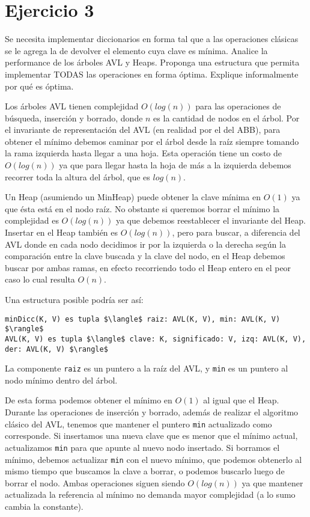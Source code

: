 \section*{Ejercicio 3}

Se necesita implementar diccionarios en forma tal que a las operaciones clásicas se le agrega la de devolver el elemento cuya clave es mínima. Analice la performance de los árboles AVL y Heaps. Proponga una estructura que permita implementar TODAS las operaciones en forma óptima. Explique informalmente por qué es óptima.

Los árboles AVL tienen complejidad $O(log(n))$ para las operaciones de búsqueda, inserción y borrado, donde $n$ es la cantidad de nodos en el árbol. Por el invariante de representación del AVL (en realidad por el del ABB), para obtener el mínimo debemos caminar por el árbol desde la raíz siempre tomando la rama izquierda hasta llegar a una hoja. Esta operación tiene un costo de $O(log(n))$ ya que para llegar hasta la hoja de más a la izquierda debemos recorrer toda la altura del árbol, que es $log(n)$.

Un Heap (asumiendo un MinHeap) puede obtener la clave mínima en $O(1)$ ya que ésta está en el nodo raíz. No obstante si queremos borrar el mínimo la complejidad es $O(log(n))$ ya que debemos reestablecer el invariante del Heap. Insertar en el Heap también es $O(log(n))$, pero para buscar, a diferencia del AVL donde en cada nodo decidimos ir por la izquierda o la derecha según la comparación entre la clave buscada y la clave del nodo, en el Heap debemos buscar por ambas ramas, en efecto recorriendo todo el Heap entero en el peor caso lo cual resulta $O(n)$.

Una estructura posible podría ser así:

\begin{lstlisting}
minDicc(K, V) es tupla $\langle$ raiz: AVL(K, V), min: AVL(K, V) $\rangle$
AVL(K, V) es tupla $\langle$ clave: K, significado: V, izq: AVL(K, V), der: AVL(K, V) $\rangle$
\end{lstlisting}

La componente \lstinline{raiz} es un puntero a la raíz del AVL, y \lstinline{min} es un puntero al nodo mínimo dentro del árbol.

De esta forma podemos obtener el mínimo en $O(1)$ al igual que el Heap. Durante las operaciones de inserción y borrado, además de realizar el algoritmo clásico del AVL, tenemos que mantener el puntero \lstinline{min} actualizado como corresponde. Si insertamos una nueva clave que es menor que el mínimo actual, actualizamos \lstinline{min} para que apunte al nuevo nodo insertado. Si borramos el mínimo, debemos actualizar \lstinline{min} con el nuevo mínimo, que podemos obtenerlo al mismo tiempo que buscamos la clave a borrar, o podemos buscarlo luego de borrar el nodo. Ambas operaciones siguen siendo $O(log(n))$ ya que mantener actualizada la referencia al mínimo no demanda mayor complejidad (a lo sumo cambia la constante).
